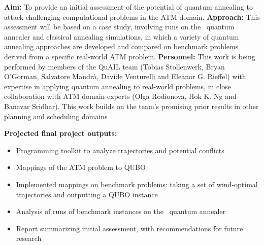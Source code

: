\noindent
{\bf Aim:} To provide an initial assessment of the potential 
of quantum annealing to attack challenging computational problems in the ATM 
domain. 
\linebreak
{\bf Approach:} This assessment will be based on a case study, involving runs
on the \DW\ quantum annealer and classical annealing simulations, in which 
a variety of quantum annealing approaches are developed and compared 
on benchmark problems derived from a specific real-world ATM problem.
\linebreak
{\bf Personnel:} This work is being performed by members of the QuAIL team (Tobias Stollenwerk, Bryan O'Gorman, Salvatore Mandr\`a, Davide Venturelli and Eleanor G. Rieffel) with expertise in applying quantum annealing to real-world problems, in close collaboration with ATM domain experts (Olga Rodionova, Hok K. Ng and Banavar Sridhar).
This work builds on the team's promising prior results in other planning and
scheduling domains~\cite{rieffel:15,venturelli:15}.
\noindent
\begin{minipage}[t]{0.9\columnwidth}
\textbf{Projected final project outputs:}
\begin{itemize}[leftmargin=0.5cm]
  \itemsep-0.5em
  \item Programming toolkit to analyze trajectories and potential conflicts
  \item Mappings of the ATM problem to QUBO
  \item Implemented mappings on benchmark problems: taking a set of wind-optimal trajectories and outputting a QUBO instance
  \item Analysis of runs of benchmark instances on the \DW\ quantum annealer 
  \item Report summarizing initial assessment, with recommendations
for future research
\end{itemize}
\end{minipage}
